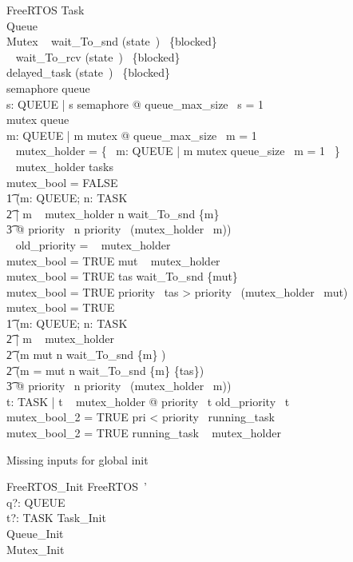 \begin{schema}{FreeRTOS}
    Task\\
    Queue\\
    Mutex
\where
    \dom~ wait\_To\_snd \subseteq (state~\inv)~ \limg \{blocked\} \rimg\\
    \dom~ wait\_To\_rcv \subseteq (state~\inv)~ \limg \{blocked\} \rimg\\
    delayed\_task \subseteq (state~\inv)~ \limg \{blocked\} \rimg\\
    semaphore \subseteq queue\\
    \forall s: QUEUE | s \in semaphore @ queue\_max\_size~ s = 1\\
    mutex \subseteq queue\\
    \forall m: QUEUE | m \in mutex @ queue\_max\_size~ m = 1\\
    \dom~ mutex\_holder = \{~ m: QUEUE | m \in mutex \land queue\_size~ m = 1 ~\}\\
    \ran~ mutex\_holder \subseteq tasks\\
    mutex\_bool = FALSE\\
    \t1 \implies (\forall m: QUEUE; n: TASK\\
    \t2     | m \in \dom~ mutex\_holder \land n \in wait\_To\_snd \inv \limg \{m\} \rimg\\
    \t3         @ priority~ n \leq priority~ (mutex\_holder~ m))\\
    \dom~ old\_priority = \ran~ mutex\_holder\\
    mutex\_bool = TRUE \implies mut \in \dom~ mutex\_holder\\
    mutex\_bool = TRUE \implies tas \in wait\_To\_snd \inv \limg \{mut\} \rimg\\
    mutex\_bool = TRUE \implies priority~ tas > priority~ (mutex\_holder~ mut)\\
    mutex\_bool = TRUE\\
    \t1 \implies (\forall m: QUEUE; n: TASK\\
    \t2     | m \in \dom~ mutex\_holder\\
    \t2     \land (m \neq mut \implies n \in wait\_To\_snd \inv \limg \{m\} \rimg)\\
    \t2     \land (m = mut \implies n \in wait\_To\_snd \inv \limg \{m\} \rimg \setminus \{tas\})\\
    \t3         @ priority~ n \leq priority~ (mutex\_holder~ m))\\
    \forall t: TASK | t \in \ran~ mutex\_holder @ priority~ t \geq old\_priority~ t\\
    mutex\_bool\_2 = TRUE \implies pri < priority~ running\_task\\
    mutex\_bool\_2 = TRUE \implies running\_task \notin \ran~ mutex\_holder
\end{schema}

Missing inputs for global init
\begin{schema}{FreeRTOS\_Init}
	FreeRTOS~' \\
	q?: QUEUE \\
	t?: TASK
\where
    Task\_Init \\
    Queue\_Init \\
    Mutex\_Init
\end{schema}
